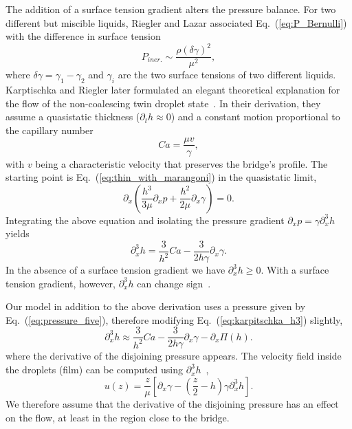 The addition of a surface tension gradient alters the pressure balance.
For two different but miscible liquids, Riegler and Lazar associated Eq.~(\ref{eq:P_Bernulli}) with the difference in surface tension~\cite{doi:10.1021/la800630w}
\begin{equation}\label{eq:P_bernulli_riegler}
    P_{iner.} \sim \frac{\rho (\delta\gamma)^2}{\mu^2}, 
\end{equation}
where $\delta\gamma = \gamma_1 - \gamma_2$ and $\gamma_i$ are the two surface tensions of two different liquids. 
Karptischka and Riegler later formulated an elegant theoretical explanation for the flow of the non-coalescing twin droplet state~\cite{PhysRevLett.109.066103}.
In their derivation, they assume a quasistatic thickness ($\partial_t h \approx 0$) and a constant motion proportional to the capillary number 
\begin{equation}\label{eq:sys_cap_vel}
    Ca = \frac{\mu v}{\gamma},
\end{equation} 
with $v$ being a characteristic velocity that preserves the bridge's profile. 
The starting point is Eq.~(\ref{eq:thin_with_marangoni}) in the quasistatic limit, 
\begin{equation}\label{eq:pressure_noncoal}
    \partial_x\left(\frac{h^3}{3\mu}\partial_x p + \frac{h^2}{2\mu}\partial_x\gamma\right) = 0.
\end{equation}
Integrating the above equation and isolating the pressure gradient $\partial_x p = \gamma\partial_x^3 h$ yields~\cite{oronLongscaleEvolutionThin1997, PhysRevLett.109.066103}
\begin{equation}\label{eq:karpitschka_h3}
    \partial_x^3 h = \frac{3}{h^2}Ca - \frac{3}{2h\gamma}\partial_x\gamma.
\end{equation}
In the absence of a surface tension gradient we have $\partial_x^3 h \geq 0$.
With a surface tension gradient, however, $\partial_x^3 h$ can change sign~\cite{PhysRevLett.109.066103}.

Our model in addition to the above derivation uses a pressure given by Eq.~(\ref{eq:pressure_five}), therefore modifying Eq.~(\ref{eq:karpitschka_h3}) slightly, 
\begin{equation}\label{eq:stefan_h3}
    \partial_x^3 h \approx \frac{3}{h^2}Ca - \frac{3}{2h\gamma}\partial_x\gamma - \partial_x\Pi(h).
\end{equation}
where the derivative of the disjoining pressure appears. 
The velocity field inside the droplets (film) can be computed using $\partial_x^3 h$~\cite{oronLongscaleEvolutionThin1997},
\begin{equation}\label{eq:Oron_correct}
    u(z) = \frac{z}{\mu}\left[\partial_x\gamma - \left(\frac{z}{2} - h\right)\gamma\partial_x^3 h\right].
\end{equation}
We therefore assume that the derivative of the disjoining pressure has an effect on the flow, at least in the region close to the bridge.

